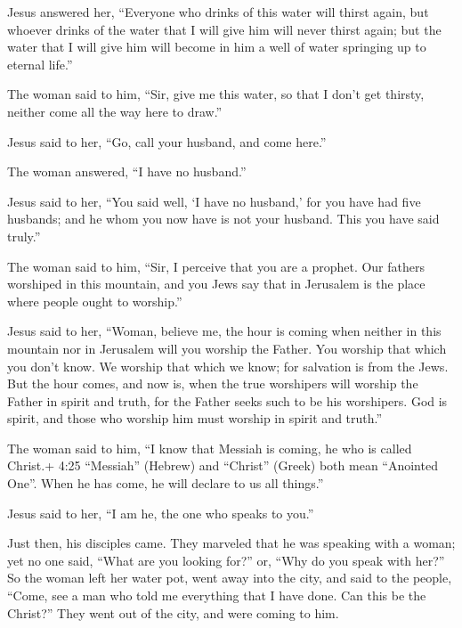  Jesus answered her, ``Everyone who drinks of this water
will thirst again,  but whoever drinks of the water that I
will give him will never thirst again; but the water that I will give
him will become in him a well of water springing up to eternal life.''

 The woman said to him, ``Sir, give me this water, so that
I don't get thirsty, neither come all the way here to draw.''

 Jesus said to her, ``Go, call your husband, and come
here.''

 The woman answered, ``I have no husband.''

Jesus said to her, ``You said well, `I have no husband,' 
for you have had five husbands; and he whom you now have is not your
husband. This you have said truly.''

 The woman said to him, ``Sir, I perceive that you are a
prophet.  Our fathers worshiped in this mountain, and you
Jews say that in Jerusalem is the place where people ought to worship.''

 Jesus said to her, ``Woman, believe me, the hour is coming
when neither in this mountain nor in Jerusalem will you worship the
Father.  You worship that which you don't know. We worship
that which we know; for salvation is from the Jews.  But
the hour comes, and now is, when the true worshipers will worship the
Father in spirit and truth, for the Father seeks such to be his
worshipers.  God is spirit, and those who worship him must
worship in spirit and truth.''

 The woman said to him, ``I know that Messiah is coming, he
who is called Christ.+ 4:25 ``Messiah'' (Hebrew) and ``Christ'' (Greek)
both mean ``Anointed One''. When he has come, he will declare to us all
things.''

 Jesus said to her, ``I am he, the one who speaks to you.''

 Just then, his disciples came. They marveled that he was
speaking with a woman; yet no one said, ``What are you looking for?''
or, ``Why do you speak with her?''  So the woman left her
water pot, went away into the city, and said to the people,
 ``Come, see a man who told me everything that I have done.
Can this be the Christ?''  They went out of the city, and
were coming to him.

